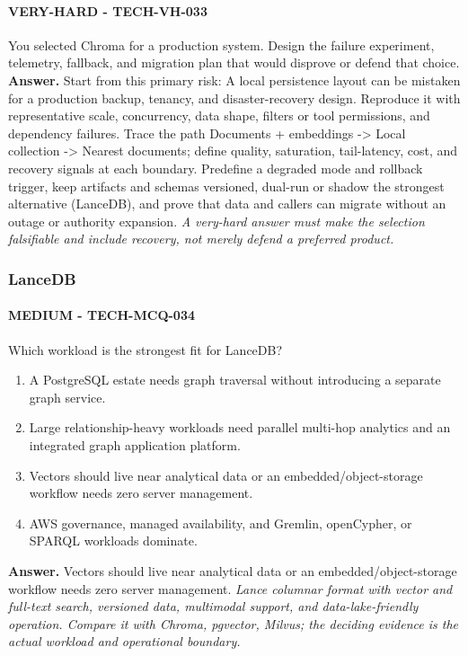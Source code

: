 \paragraph{VERY-HARD - TECH-VH-033} You selected Chroma for a production system. Design the failure experiment, telemetry, fallback, and migration plan that would disprove or defend that choice.
\textbf{Answer.} Start from this primary risk: A local persistence layout can be mistaken for a production backup, tenancy, and disaster-recovery design. Reproduce it with representative scale, concurrency, data shape, filters or tool permissions, and dependency failures. Trace the path Documents + embeddings -> Local collection -> Nearest documents; define quality, saturation, tail-latency, cost, and recovery signals at each boundary. Predefine a degraded mode and rollback trigger, keep artifacts and schemas versioned, dual-run or shadow the strongest alternative (LanceDB), and prove that data and callers can migrate without an outage or authority expansion.
\textit{A very-hard answer must make the selection falsifiable and include recovery, not merely defend a preferred product.}
\subsubsection*{LanceDB}
\paragraph{MEDIUM - TECH-MCQ-034} Which workload is the strongest fit for LanceDB?
\begin{enumerate}[label=\Alph*.]
\item A PostgreSQL estate needs graph traversal without introducing a separate graph service.
\item Large relationship-heavy workloads need parallel multi-hop analytics and an integrated graph application platform.
\item Vectors should live near analytical data or an embedded/object-storage workflow needs zero server management.
\item AWS governance, managed availability, and Gremlin, openCypher, or SPARQL workloads dominate.
\end{enumerate}
\textbf{Answer.} Vectors should live near analytical data or an embedded/object-storage workflow needs zero server management.
\textit{Lance columnar format with vector and full-text search, versioned data, multimodal support, and data-lake-friendly operation. Compare it with Chroma, pgvector, Milvus; the deciding evidence is the actual workload and operational boundary.}
